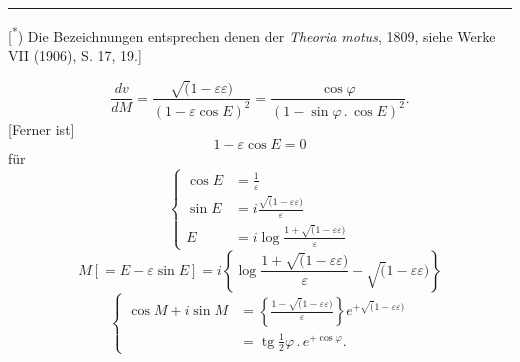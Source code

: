 \par\vfill\noindent\rule{.25\linewidth}{.4pt}\par\smallskip
{\footnotesize\noindent\hspace*{\parindent}[\textsuperscript{*}) Die Bezeichnungen entsprechen denen der \textit{Theoria motus}, {\scriptsize 1809}, siehe Werke VII ({\scriptsize 1906}), S. {\scriptsize 17, 19}.]\par}
\clearpage{}
\begin{equation}\frac{dv}{dM}=\frac{\surd(1-\varepsilon\varepsilon)}{(1-\varepsilon\cos E)^2}=\frac{\cos\varphi}{(1-\sin\varphi\,{.}\,\cos E)^2}.\tag*{[6]}\end{equation}
\noindent\hspace*{\parindent}[Ferner ist]
\begin{equation}1-\varepsilon\cos E=0\tag*{[7]}\end{equation}
\noindent für
\begin{equation}\left\{\begin{aligned}
\cos E&=\frac1\varepsilon\\
\sin E&=i\frac{\surd(1-\varepsilon\varepsilon)}{\varepsilon}\\
E&=i\log\frac{1+\surd(1-\varepsilon\varepsilon)}{\varepsilon}
\end{aligned}\right.\tag*{[8]}\end{equation}
\begin{equation}M[=E-\varepsilon\sin E]=i\left\{\log\frac{1+\surd(1-\varepsilon\varepsilon)}{\varepsilon}-\surd(1-\varepsilon\varepsilon)\right\}\tag*{[9]}\end{equation}
\begin{equation}\left\{\begin{aligned}
\cos M+i\sin M&=\left\{\frac{1-\surd(1-\varepsilon\varepsilon)}{\varepsilon}\right\}e^{+\surd(1-\varepsilon\varepsilon)}\\
 &=\operatorname{tg}\tfrac12\varphi\,{.}\,e^{+\cos\varphi}.
\end{aligned}\right.\tag*{[10]}\end{equation}
\begin{center}\end{center}
\begingroup\small\setlength{\arraycolsep}{8pt}\renewcommand{\arraystretch}{1.35}
